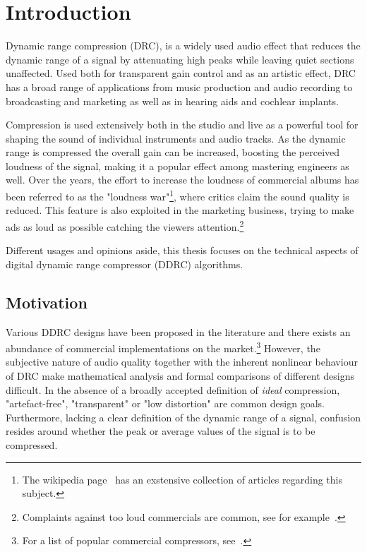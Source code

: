 \documentclass[../main2.tex]{subfiles}
\begin{document}
\section{Introduction}
Dynamic range compression (DRC), is a widely used audio effect that reduces the dynamic range of a signal by attenuating high peaks while leaving quiet sections unaffected. Used both for transparent gain control and as an artistic effect, DRC has a broad range of applications from music production and audio recording to broadcasting and marketing as well as in hearing aids and cochlear implants.

Compression is used extensively both in the studio and live as a powerful tool for shaping the sound of individual instruments and audio tracks. As the dynamic range is compressed the overall gain can be increased, boosting the perceived loudness of the signal, making it a popular effect among mastering engineers as well. Over the years, the effort to increase the loudness of commercial albums has been referred to as the "loudness war"\footnote{The wikipedia page~\cite{loudness_war} has an exstensive collection of articles regarding this subject.}, where critics claim the sound quality is reduced. This feature is also exploited in the marketing business, trying to make ads as loud as possible catching the viewers attention.\footnote{Complaints against too loud commercials are common, see for example~\cite{comp_ads}.} 

Different usages and opinions aside, this thesis focuses on the technical aspects of digital dynamic range compressor (DDRC) algorithms. 


\subsection{Motivation}
Various DDRC designs have been proposed in the literature and there exists an abundance of commercial implementations on the market.\footnote{For a list of popular commercial compressors, see~\cite{commercial}.} However, the subjective nature of audio quality together with the inherent nonlinear behaviour of DRC make mathematical analysis and formal comparisons of different designs difficult. In the absence of a broadly accepted definition of \emph{ideal} compression, "artefact-free", "transparent" or "low distortion" are common design goals. Furthermore, lacking a clear definition of the dynamic range of a signal, confusion resides around whether the peak or average values of the signal is to be compressed. 
\end{document}
